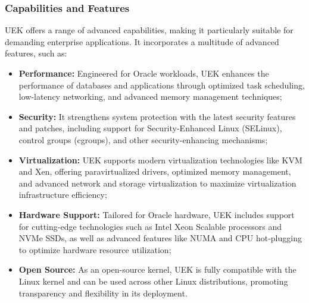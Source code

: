 \subsubsection[Capabilities and Features]{Capabilities and Features}
UEK offers a range of advanced capabilities, making it particularly suitable for demanding enterprise applications.  It incorporates a multitude of advanced features, such as:
\begin{itemize}
    \item \textbf{Performance:} Engineered for Oracle workloads, UEK enhances the performance of databases and applications through optimized task scheduling, low-latency networking, and advanced memory management techniques;
    \item \textbf{Security:} It strengthens system protection with the latest security features and patches, including support for Security-Enhanced Linux (SELinux), control groups (cgroups), and other security-enhancing mechanisms;
    \item \textbf{Virtualization:} UEK supports modern virtualization technologies like KVM and Xen, offering paravirtualized drivers, optimized memory management, and advanced network and storage virtualization to maximize virtualization infrastructure efficiency;
    \item \textbf{Hardware Support:} Tailored for Oracle hardware, UEK includes support for cutting-edge technologies such as Intel Xeon Scalable processors and NVMe SSDs, as well as advanced features like NUMA and CPU hot-plugging to optimize hardware resource utilization;
    \item \textbf{Open Source:} As an open-source kernel, UEK is fully compatible with the Linux kernel and can be used across other Linux distributions, promoting transparency and flexibility in its deployment.
\end{itemize}

